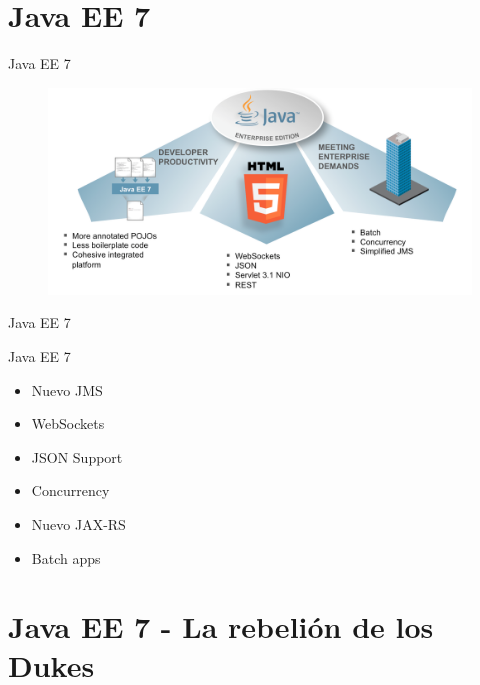 \documentclass{beamer}
\begin{document}



\section{Java EE 7}

\begin{frame}{Java EE 7}
\begin{figure}
\centering
\includegraphics[width=\linewidth]{Images/javaee7-theme}
\end{figure}
\end{frame}

\begin{frame}{Java EE 7}
\begin{exampleblock}{Java EE 7}
\begin{itemize}
\item Nuevo JMS
\item WebSockets
\item JSON Support
\item Concurrency
\item Nuevo JAX-RS
\item Batch apps
\end{itemize}
\end{exampleblock}
\end{frame}



\section{Java EE 7 - La rebelión de los Dukes}
\end{document}
